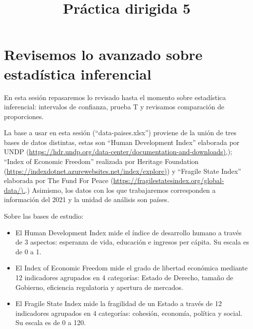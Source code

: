 \documentclass[
]{article}
\title{Práctica dirigida 5}
\author{}
\date{\vspace{-2.5em}}
\begin{document}
\maketitle

{
\setcounter{tocdepth}{1}
\tableofcontents
}
\hypertarget{revisemos-lo-avanzado-sobre-estaduxedstica-inferencial}{%
\section{\texorpdfstring{\textbf{Revisemos lo avanzado sobre estadística
inferencial}}{Revisemos lo avanzado sobre estadística inferencial}}\label{revisemos-lo-avanzado-sobre-estaduxedstica-inferencial}}

En esta sesión repasaremos lo revisado hasta el momento sobre
estadística inferencial: intervalos de confianza, prueba T y revisamos
comparación de proporciones.

La base a usar en esta sesión (``data-paises.xlsx'') proviene de la
unión de tres bases de datos distintas, estas son ``Human Development
Index'' elaborada por UNDP
(\href{https://hdr.undp.org/data-center/documentation-and-downloads}{https://hdr.undp.org/data-center/documentation-and-downloads)},);
``Index of Economic Freedom'' realizada por Heritage Foundation
(\href{https://indexdotnet.azurewebsites.net/index/explore}{https://indexdotnet.azurewebsites.net/index/explore)})
y ``Fragile State Index'' elaborada por The Fund For Peace
(\href{https://fragilestatesindex.org/global-data/}{https://fragilestatesindex.org/global-data/).}.)
Asimismo, los datos con los que trabajaremos corresponden a información
del 2021 y la unidad de análisis son países.

Sobre las bases de estudio:

\begin{itemize}
\item
  El Human Development Index mide el índice de desarrollo humano a
  través de 3 aspectos: esperanza de vida, educación e ingresos per
  cápita. Su escala es de 0 a 1.
\item
  El Index of Economic Freedom mide el grado de libertad económica
  mediante 12 indicadores agrupados en 4 categorías: Estado de Derecho,
  tamaño de Gobierno, eficiencia regulatoria y apertura de mercados.
\item
  El Fragile State Index mide la fragilidad de un Estado a través de 12
  indicadores agrupados en 4 categorías: cohesión, economía, política y
  social. Su escala es de 0 a 120.
\end{itemize}
\end{document}
